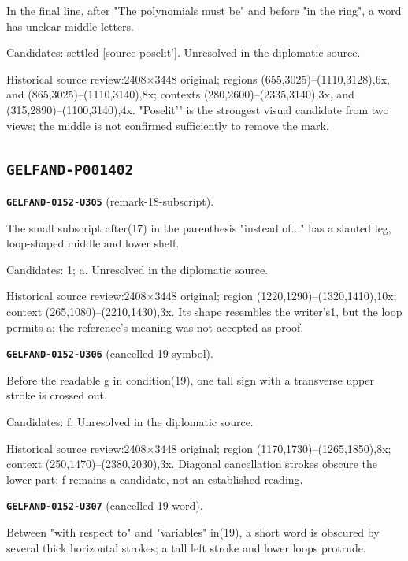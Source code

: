 In the final line, after "The polynomials must be" and before "in the ring", a word has unclear middle letters.\par
Candidates: settled [source poselit']. Unresolved in the diplomatic source.\par
Historical source review:2408×3448 original; regions (655,3025)–(1110,3128),6x, and (865,3025)–(1110,3140),8x; contexts (280,2600)–(2335,3140),3x, and (315,2890)–(1100,3140),4x. "Poselit'" is the strongest visual candidate from two views; the middle is not confirmed sufficiently to remove the mark.\par\medskip
\subsection*{\texttt{GELFAND-P001402}}
\par\noindent\leavevmode{}\label{GELFAND-0152-U305}\textbf{\texttt{GELFAND-0152-U305}} (remark-18-subscript).\nopagebreak[4]\par
The small subscript after(17) in the parenthesis "instead of..." has a slanted leg, loop-shaped middle and lower shelf.\par
Candidates: 1; a. Unresolved in the diplomatic source.\par
Historical source review:2408×3448 original; region (1220,1290)–(1320,1410),10x; context (265,1080)–(2210,1430),3x. Its shape resembles the writer's1, but the loop permits a; the reference's meaning was not accepted as proof.\par\medskip
\par\noindent\leavevmode{}\label{GELFAND-0152-U306}\textbf{\texttt{GELFAND-0152-U306}} (cancelled-19-symbol).\nopagebreak[4]\par
Before the readable g in condition(19), one tall sign with a transverse upper stroke is crossed out.\par
Candidates: f. Unresolved in the diplomatic source.\par
Historical source review:2408×3448 original; region (1170,1730)–(1265,1850),8x; context (250,1470)–(2380,2030),3x. Diagonal cancellation strokes obscure the lower part; f remains a candidate, not an established reading.\par\medskip
\par\noindent\leavevmode{}\label{GELFAND-0152-U307}\textbf{\texttt{GELFAND-0152-U307}} (cancelled-19-word).\nopagebreak[4]\par
Between "with respect to" and "variables" in(19), a short word is obscured by several thick horizontal strokes; a tall left stroke and lower loops protrude.\par
